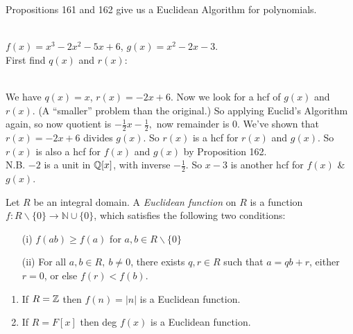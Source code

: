  Propositions 161 and 162 give us a Euclidean Algorithm for polynomials. \\

\begin{example} \\$f(x) = x^3 - 2x^2 -5x + 6$, $g(x) = x^2 - 2x -3$.\\
First find $q(x)$ and $r(x)$:\\
~

 We have $q(x) = x$, $r(x) = -2x + 6$. Now we look for a hcf of $g(x)$ and $r(x).$ (A ``smaller'' problem than the original.) So applying Euclid's Algorithm again, so now quotient is $-\frac{1}{2}x - \frac{1}{2} ,$ now remainder is $0$. We've shown that $r(x) = -2x + 6$ divides $g(x)$. So $r(x)$ is a hcf for $r(x)$ and $g(x)$. So $r(x)$ is also a hcf for $f(x)$ and $g(x)$ by Proposition 162.\\

N.B. $-2$ is a unit in $\mathbb{Q}[x]$, with inverse $-\frac{1}{2}$. So $x-3$ is another hcf for $f(x)$ \& $g(x)$.
\end{example}



\begin{definition} Let  
 $R$ be an integral domain. A \emph{Euclidean function} on $R$ is a function $f: R\backslash\{0\} \to \mathbb{N} \cup \{0\}$, which satisfies the following two conditions: \begin{enumerate}
 \item[(i)] $f(ab) \geq f(a)$ for $a,b \in R\backslash\{0\}$
 \item[(ii)] For all $a,b \in R,~b \neq 0$, there exists $q,r \in R$ such that $a = qb + r$, either $r = 0$, or else $f(r) < f(b)$.	
 \end{enumerate}\end{definition}

\begin{examples} \begin{enumerate}
 \item If $R = \mathbb{Z}$ then $f(n) = |n|$ is a Euclidean function. 
 \item If $R = F[x]$ then deg $f(x)$ is a Euclidean function.	
 \end{enumerate}\end{examples}
 \vspace*{5pt}

